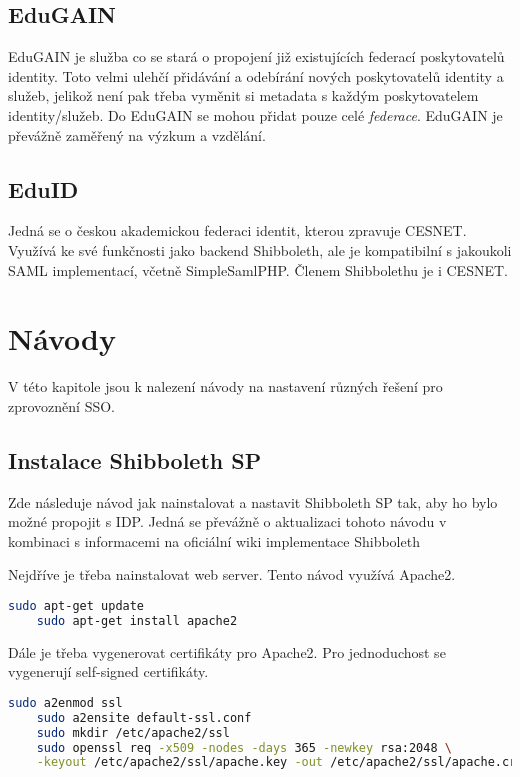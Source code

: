 \section{EduGAIN} %

EduGAIN je služba co se stará o propojení již existujících federací poskytovatelů identity. Toto velmi ulehčí přidávání a odebírání nových poskytovatelů identity a služeb, jelikož není pak třeba vyměnit si metadata s každým poskytovatelem identity/služeb. Do EduGAIN se mohou přidat pouze celé \emph{federace}. \cite{edugainWikipedie}\cite{edugain}
EduGAIN je převážně zaměřený na výzkum a vzdělání.

\section{EduID} %

Jedná se o českou akademickou federaci identit, kterou zpravuje CESNET. 
Využívá ke své funkčnosti jako backend Shibboleth, ale je kompatibilní s jakoukoli SAML implementací, včetně SimpleSamlPHP. Členem Shibbolethu je i CESNET.\cite{eduid}

\chapter{Návody}
\label{návod}

V této kapitole jsou k nalezení návody na nastavení různých řešení pro zprovoznění SSO.

\section{Instalace Shibboleth SP} \label{instalaceShibboleth}

Zde následuje návod jak nainstalovat a nastavit Shibboleth SP tak, aby ho bylo možné propojit s IDP. Jedná se převážně o aktualizaci tohoto návodu\cite{shibbolethSpInstallation} v kombinaci s informacemi na oficiální wiki implementace Shibboleth\cite{shibbolethWikiSP}

Nejdříve je třeba nainstalovat web server. Tento návod využívá Apache2.
\begin{lstlisting}[language=Bash]
    sudo apt-get update
    sudo apt-get install apache2
\end{lstlisting}

Dále je třeba vygenerovat certifikáty pro Apache2. Pro jednoduchost se vygenerují self-signed certifikáty.
\begin{lstlisting}[language=Bash]
    sudo a2enmod ssl
    sudo a2ensite default-ssl.conf
    sudo mkdir /etc/apache2/ssl
    sudo openssl req -x509 -nodes -days 365 -newkey rsa:2048 \
    -keyout /etc/apache2/ssl/apache.key -out /etc/apache2/ssl/apache.crt
\end{lstlisting}

